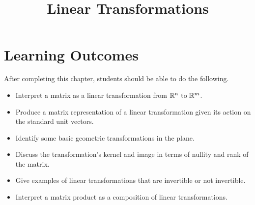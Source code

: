 \documentclass{ximera}
\title{Linear Transformations}
\begin{document}
\begin{abstract}

\end{abstract}
 
\maketitle
 
\section*{Learning Outcomes}
After completing this chapter, students should be able to do the following.
 
\begin{itemize}
    \item Interpret a matrix as a linear transformation from $\mathbb{R}^n$ to $\mathbb{R}^m$.
    \item Produce a matrix representation of a linear transformation given its action on the standard unit vectors.
    \item Identify some basic geometric transformations in the plane.
    \item Discuss the transformation’s kernel and image in terms of nullity and rank of the matrix.
    \item Give examples of linear transformations that are invertible or not invertible.
    \item  Interpret a matrix product as a composition of linear transformations.
 
\end{itemize}

 
\end{document}
